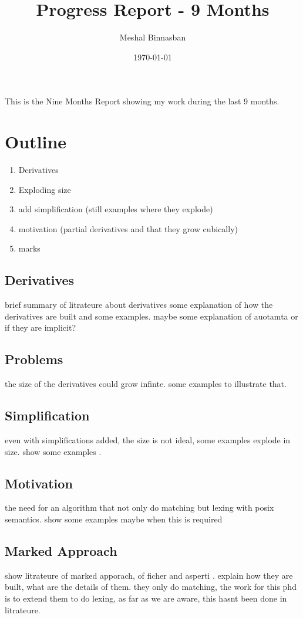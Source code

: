 \documentclass[11pt]{article}
\title{Progress Report - 9 Months}
\author{Meshal Binnasban}
\date{\today}
\begin{document}
\maketitle
This is the Nine Months Report showing my work during the last 9 months.
\section{Outline}
\begin{enumerate}
\item Derivatives
\item Exploding size
\item add simplification (still examples where they explode)
\item motivation (partial derivatives and that they grow cubically)
\item marks
\end{enumerate}

\subsection{Derivatives}
brief summary of litrateure about derivatives
some explanation of how the derivatives are built and some examples.
maybe some explanation of auotamta or if they are implicit?

\subsection{Problems}
the size of the derivatives could grow infinte. some examples to illustrate that.

\subsection{Simplification}
even with simplifications added, the size is not ideal, some examples explode in size. show some examples .

\subsection{Motivation}
the need for an algorithm that not only do matching but lexing with posix semantics. show some examples maybe
when this is required

\subsection{Marked Approach}
show litrateure of marked apporach, of ficher \cite{Fischer2010} and asperti \cite{Asperti2010}. explain how 
they are built, what are the details of them. they only do matching, the work for this phd is to extend
them to do lexing, as far as we are aware, this hasnt been done in litrateure. 
\end{document}
